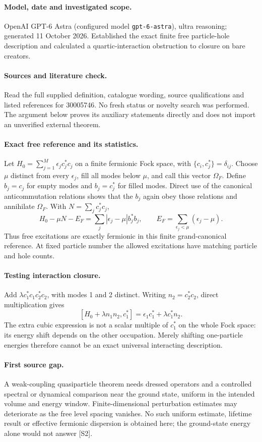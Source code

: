\documentclass[11pt]{article}
\begin{document}
\paragraph{Model, date and investigated scope.}
OpenAI GPT-6 Astra (configured model \texttt{gpt-6-astra}), ultra reasoning; generated 11 October 2026. Established the exact finite free particle-hole description and calculated a quartic-interaction obstruction to closure on bare creators.

\paragraph{Sources and literature check.}
Read the full supplied definition, catalogue wording, source qualifications and listed references for 30005746. No fresh status or novelty search was performed. The argument below proves its auxiliary statements directly and does not import an unverified external theorem.

\paragraph{Exact free reference and its statistics.} Let \(H_0=\sum_{j=1}^M\epsilon_j c_j^*c_j\) on a finite fermionic Fock space, with \(\{c_i,c_j^*\}=\delta_{ij}\). Choose \(\mu\) distinct from every \(\epsilon_j\), fill all modes below \(\mu\), and call this vector \(\Omega_F\). Define \(b_j=c_j\) for empty modes and \(b_j=c_j^*\) for filled modes. Direct use of the canonical anticommutation relations shows that the \(b_j\) again obey those relations and annihilate \(\Omega_F\). With \(N=\sum_jc_j^*c_j\),
\[
 H_0-\mu N-E_F=\sum_j|\epsilon_j-\mu|b_j^*b_j,
 \qquad E_F=\sum_{\epsilon_j<\mu}(\epsilon_j-\mu).
\]
Thus free excitations are exactly fermionic in this finite grand-canonical reference. At fixed particle number the allowed excitations have matching particle and hole counts.
\paragraph{Testing interaction closure.} Add \(\lambda c_1^*c_1c_2^*c_2\), with modes 1 and 2 distinct. Writing \(n_2=c_2^*c_2\), direct multiplication gives
\[
 [H_0+\lambda n_1n_2,c_1^*]
 =\epsilon_1c_1^*+\lambda c_1^*n_2.
\]
The extra cubic expression is not a scalar multiple of \(c_1^*\) on the whole Fock space: its energy shift depends on the other occupation. Merely shifting one-particle energies therefore cannot be an exact universal interacting description.
\paragraph{First source gap.} A weak-coupling quasiparticle theorem needs dressed operators and a controlled spectral or dynamical comparison near the ground state, uniform in the intended volume and energy window. Finite-dimensional perturbation estimates may deteriorate as the free level spacing vanishes. No such uniform estimate, lifetime result or effective fermionic dispersion is obtained here; the ground-state energy alone would not answer [S2].
\end{document}
